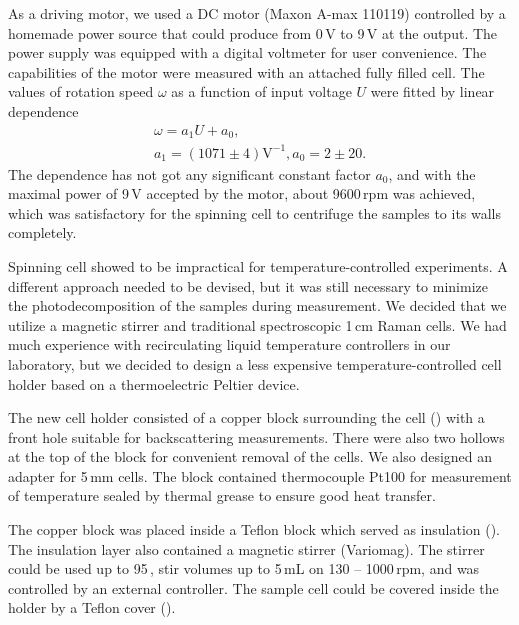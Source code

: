 As a driving motor, we used a DC motor (Maxon A-max 110119) controlled by a
homemade power source that could produce from 0\,V to 9\,V at the output.
The power supply was equipped with a digital voltmeter for user convenience.
The capabilities of the motor were measured with an attached fully filled cell.
The values of rotation speed $\omega$ as a function of input voltage $U$ were
fitted by linear dependence
\begin{gather*}
	\omega = a_1U + a_0,\\
	a_1 = (1071 \pm 4) \text{V}^{-1}, a_0 = 2 \pm 20.
\end{gather*}
The dependence has not got any significant constant factor $a_0$, and with the
maximal power of 9\,V accepted by the motor, about 9600\,rpm was achieved,
which was satisfactory for the spinning cell to centrifuge the samples to its
walls completely.

Spinning cell
showed to be impractical for temperature-controlled experiments.
A different approach needed to be devised, but it was still necessary to
minimize the photodecomposition of the samples during measurement.
We decided that we utilize a magnetic stirrer and traditional spectroscopic
1\,cm Raman cells.
We had much experience with recirculating liquid temperature controllers in our
laboratory, but we decided to design a less expensive temperature-controlled
cell holder based on a thermoelectric Peltier device.

The new cell holder consisted of a copper block surrounding the cell
()
with a front hole suitable for backscattering measurements.
There were also two hollows at the top of the block for convenient removal of
the cells.
We also designed an adapter for 5\,mm cells.
The block contained thermocouple Pt100 for measurement of temperature sealed by
thermal grease to ensure good heat transfer.

The copper block was placed inside a Teflon block which served as insulation
().
The insulation layer also contained a magnetic stirrer (Variomag).
The stirrer could be used up to 95\,\textcelsius{}, stir volumes up to 5\,mL on
130 -- 1000\,rpm, and was controlled by an external controller.
The sample cell could be covered inside the holder by a Teflon cover
().

\begin{figure}
	\centering
	\caption[%
		Thermostated cell holder copper core.%
	]{%
	}
	\label{\figlabel{thermostated_holder:core_drawing}}
\end{figure}

